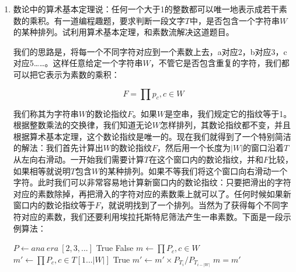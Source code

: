 \documentclass[UTF8]{article}
\begin{document}
\begin{Exercise}
\end{Exercise}

\begin{Exercise}
\end{Exercise}

\begin{enumerate}
\item 数论中的算术基本定理说：任何一个大于1的整数都可以唯一地表示成若干素数的乘积。有一道编程趣题，要求判断一段文字$T$中，是否包含一个字符串$W$的某种排列。试利用算术基本定理，和素数流解决这道题目。

我们的思路是，将每一个不同字符对应到一个素数上去，a对应2，b对应3，c对应5……。这样任意给定一个字符串$W$，不管它是否包含重复的字符，我们都可以把它表示为素数的乘积：

\[
F = \prod p_c , c \in W
\]

我们称其为字符串$W$的数论指纹$F$。如果$W$是空串，我们规定它的指纹等于1。根据整数乘法的交换律，我们知道无论$W$怎样排列，其数论指纹都不变，并且根据算术基本定理，这个数论指纹是唯一的。现在我们就得到了一个特别简洁的解法：我们首先计算出$W$的数论指纹$F$，然后用一个长度为$|W|$的窗口沿着$T$从左向右滑动。一开始我们需要计算$T$在这个窗口内的数论指纹，并和$F$比较，如果相等就说明$T$包含$W$的某种排列。如果不等我们将这个窗口向右滑动一个字符。此时我们可以非常容易地计算新窗口内的数论指纹：只要把滑出的字符对应的素数除掉，再把滑入的字符对应的素数乘上就可以了。任何时候如果新窗口内的数论指纹等于$F$，就说明找到了一个排列。当然为了获得每个不同字符对应的素数，我们还要利用埃拉托斯特尼筛法产生一串素数。下面是一段示例算法：

\begin{algorithmic}
  \State $P \gets ana \ era \ [2, 3, ...]$ 
    \State \Return True
  \EndIf
    \State \Return False
  \EndIf
  \State $\displaystyle m \gets \prod P_c, c \in W$
  \State $\displaystyle m' \gets \prod P_c, c \in T[1...|W|]$
      \State \Return True
    \EndIf
    \State $m' \gets m' \times P_{T_i} / P_{T_{i - |W|}} $
  \EndFor
  \State \Return $m = m'$
\EndFunction
\end{algorithmic}

\end{enumerate}
\end{document}
